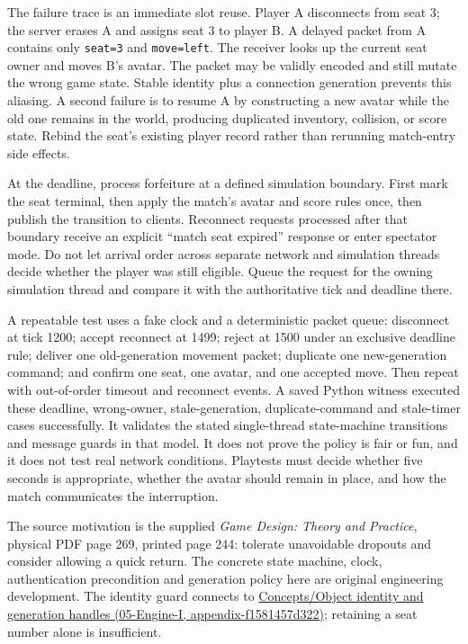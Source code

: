 The failure trace is an immediate slot reuse. Player A disconnects from seat 3; the server erases A and assigns seat 3 to player B. A delayed packet from A contains only \texttt{seat=3} and \texttt{move=left}. The receiver looks up the current seat owner and moves B's avatar. The packet may be validly encoded and still mutate the wrong game state. Stable identity plus a connection generation prevents this aliasing. A second failure is to resume A by constructing a new avatar while the old one remains in the world, producing duplicated inventory, collision, or score state. Rebind the seat's existing player record rather than rerunning match-entry side effects.

At the deadline, process forfeiture at a defined simulation boundary. First mark the seat terminal, then apply the match's avatar and score rules once, then publish the transition to clients. Reconnect requests processed after that boundary receive an explicit ``match seat expired'' response or enter spectator mode. Do not let arrival order across separate network and simulation threads decide whether the player was still eligible. Queue the request for the owning simulation thread and compare it with the authoritative tick and deadline there.

A repeatable test uses a fake clock and a deterministic packet queue: disconnect at tick 1200; accept reconnect at 1499; reject at 1500 under an exclusive deadline rule; deliver one old-generation movement packet; duplicate one new-generation command; and confirm one seat, one avatar, and one accepted move. Then repeat with out-of-order timeout and reconnect events. A saved Python witness executed these deadline, wrong-owner, stale-generation, duplicate-command and stale-timer cases successfully. It validates the stated single-thread state-machine transitions and message guards in that model. It does not prove the policy is fair or fun, and it does not test real network conditions. Playtests must decide whether five seconds is appropriate, whether the avatar should remain in place, and how the match communicates the interruption.

The source motivation is the supplied \emph{Game Design: Theory and Practice}, physical PDF page 269, printed page 244: tolerate unavoidable dropouts and consider allowing a quick return. The concrete state machine, clock, authentication precondition and generation policy here are original engineering development. The identity guard connects to \href{}{Concepts/Object identity and generation handles (05-Engine-I, appendix-f1581457d322)}; retaining a seat number alone is insufficient.

